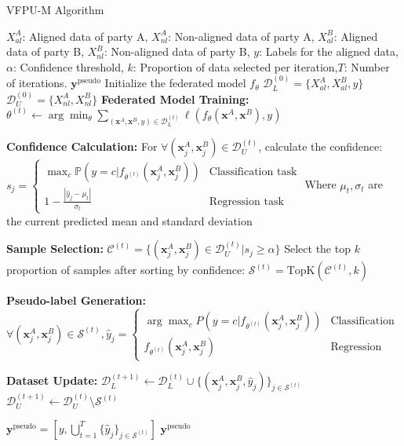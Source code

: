 \documentclass{article}  %
\begin{document}
	\begin{algorithm} 
		\caption{VFPU-M Algorithm}
		\begin{algorithmic}[1]
			\Require $X_{al}^A$: Aligned data of party A, $X_{nl}^A$: Non-aligned data of party A, $X_{al}^B$: Aligned data of party B, $X_{nl}^B$: Non-aligned data of party B, $y$: Labels for the aligned data, $\alpha$: Confidence threshold, $k$: Proportion of data selected per iteration,$T$: Number of iterations.  
			\Ensure $\mathbf{y}^{\text{pseudo}}$
			\State Initialize the federated model $f_\theta$
			\State $\mathcal{D}_{L}^{(0)} = \{X_{al}^A, X_{al}^B, y\}$
			\State $\mathcal{D}_{U}^{(0)} = \{X_{nl}^A, X_{nl}^B\}$
			\State \textbf{Federated Model Training:}
			\State $\theta^{(t)} \leftarrow \arg\min_\theta \sum_{(\mathbf{x}^A,\mathbf{x}^B,y)\in\mathcal{D}_L^{(t)}} \ell(f_\theta(\mathbf{x}^A,\mathbf{x}^B), y)$
			
			\State \textbf{Confidence Calculation:}
			\State For $\forall (\mathbf{x}^A_j,\mathbf{x}^B_j) \in \mathcal{D}_U^{(t)}$, calculate the confidence:
			\State $s_j = \begin{cases} 
				\max_{c} \mathbb{P}(y=c|f_{\theta^{(t)}}(\mathbf{x}^A_j,\mathbf{x}^B_j)) & \text{Classification task} \\
				1 - \frac{|\hat{y}_j - \mu_t|}{\sigma_t} & \text{Regression task}
			\end{cases}$
			\State Where $\mu_t,\sigma_t$ are the current predicted mean and standard deviation
			
			\State \textbf{Sample Selection:}
			\State $\mathcal{C}^{(t)} = \{(\mathbf{x}^A_j,\mathbf{x}^B_j) \in \mathcal{D}_U^{(t)} | s_j \geq \alpha\}$
			\State Select the top $k$ proportion of samples after sorting by confidence:
			\State $\mathcal{S}^{(t)} = \text{TopK}(\mathcal{C}^{(t)}, k)$
			
			\State \textbf{Pseudo-label Generation:}
			\State $\forall (\mathbf{x}^A_j,\mathbf{x}^B_j) \in \mathcal{S}^{(t)}, \hat{y}_j = \begin{cases}
				\arg\max_c P(y=c|f_{\theta^{(t)}}(\mathbf{x}^A_j,\mathbf{x}^B_j)) & \text{Classification} \\
				f_{\theta^{(t)}}(\mathbf{x}^A_j,\mathbf{x}^B_j) & \text{Regression}
			\end{cases}$
			
			\State \textbf{Dataset Update:}
			\State $\mathcal{D}_L^{(t+1)} \leftarrow \mathcal{D}_L^{(t)} \cup \{(\mathbf{x}^A_j,\mathbf{x}^B_j,\hat{y}_j)\}_{j\in\mathcal{S}^{(t)}}$
			\State $\mathcal{D}_U^{(t+1)} \leftarrow \mathcal{D}_U^{(t)} \setminus \mathcal{S}^{(t)}$
			\EndFor
			
			\State $\mathbf{y}^{\text{pseudo}} = \left[ y, \bigcup_{t=1}^{T} \{\hat{y}_j\}_{j \in \mathcal{S}^{(t)}} \right]$
			\Return $\mathbf{y}^{\text{pseudo}}$
		\end{algorithmic}
	\end{algorithm}
	
	
\end{document}
